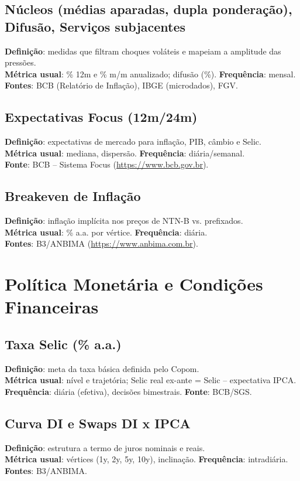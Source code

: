\documentclass[11pt,a4paper]{article}
\begin{document}
\subsection*{Núcleos (médias aparadas, dupla ponderação), Difusão, Serviços subjacentes}
\textbf{Definição}: medidas que filtram choques voláteis e mapeiam a amplitude das pressões.\\
\textbf{Métrica usual}: \% 12m e \% m/m anualizado; difusão (\%). \textbf{Frequência}: mensal.\\
\textbf{Fontes}: BCB (Relatório de Inflação), IBGE (microdados), FGV.

\subsection*{Expectativas Focus (12m/24m)}
\textbf{Definição}: expectativas de mercado para inflação, PIB, câmbio e Selic.\\
\textbf{Métrica usual}: mediana, dispersão. \textbf{Frequência}: diária/semanal.\\
\textbf{Fonte}: BCB -- Sistema Focus (\url{https://www.bcb.gov.br}).

\subsection*{Breakeven de Inflação}
\textbf{Definição}: inflação implícita nos preços de NTN-B vs. prefixados.\\
\textbf{Métrica usual}: \% a.a. por vértice. \textbf{Frequência}: diária.\\
\textbf{Fontes}: B3/ANBIMA (\url{https://www.anbima.com.br}).

\section{Política Monetária e Condições Financeiras}
\subsection*{Taxa Selic (\% a.a.)}
\textbf{Definição}: meta da taxa básica definida pelo Copom.\\
\textbf{Métrica usual}: nível e trajetória; Selic real ex-ante = Selic -- expectativa IPCA.\\
\textbf{Frequência}: diária (efetiva), decisões bimestrais. \textbf{Fonte}: BCB/SGS.

\subsection*{Curva DI e Swaps DI x IPCA}
\textbf{Definição}: estrutura a termo de juros nominais e reais.\\
\textbf{Métrica usual}: vértices (1y, 2y, 5y, 10y), inclinação. \textbf{Frequência}: intradiária.\\
\textbf{Fontes}: B3/ANBIMA.
\end{document}
